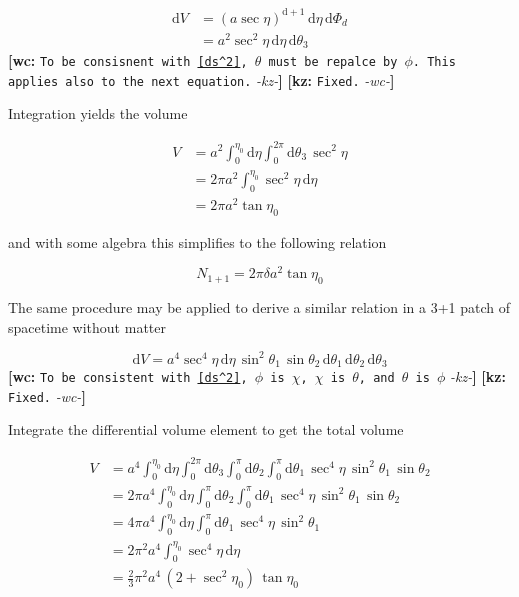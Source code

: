 \documentclass[preprint,notitlepage,amsmath,amssymb,floatfix]{revtex4-1}
\newcommand{\XXX}[3]{{\bf [#1: } {\tt #3} {\it -#2-}{\bf ]}}
\begin{document}
\begin{equation}
\begin{split}
\mathrm{d}V &= \left(a\sec\eta\right)^{\mathrm{d}+1}\,\mathrm{d}\eta\,\mathrm{d}\Phi_d \\
   &= a^2\sec^2\eta\,\mathrm{d}\eta\,\mathrm{d}\theta_3
\end{split}
\end{equation}
\XXX{wc}{kz}{To be consisnent with~\eqref{ds^2}, $\theta$ must be repalce by $\phi$. This applies also to the next equation.} \XXX{kz}{wc}{Fixed.}

\noindent Integration yields the volume

\begin{equation}
\begin{split}
V &= a^2\int_0^{\eta_0}\!\mathrm{d}\eta\int_0^{2\pi}\!\mathrm{d}\theta_3\,\sec^2\eta \\
  &= 2\pi a^2\int_0^{\eta_0}\!\sec^2\eta\,\mathrm{d}\eta \\
  &= 2\pi a^2\tan\eta_0
\end{split}
\end{equation}

\noindent and with some algebra this simplifies to the following relation

\begin{equation}
\label{eq:finalN1}
N_{\mathrm{1+1}} = 2\pi\delta a^2\tan\eta_0
\end{equation}

\noindent The same procedure may be applied to derive a similar relation in a 3+1 patch of spacetime without matter

\begin{equation}
\mathrm{d}V = a^4\sec^4\eta\,\mathrm{d}\eta\,\sin^2\theta_1\,\sin\theta_2\,\mathrm{d}\theta_1\,\mathrm{d}\theta_2\,\mathrm{d}\theta_3
\end{equation}
\XXX{wc}{kz}{To be consistent with~\eqref{ds^2}, $\phi$ is $\chi$, $\chi$ is $\theta$, and $\theta$ is $\phi$} \XXX{kz}{wc}{Fixed.}

\noindent Integrate the differential volume element to get the total volume

\begin{equation}
\begin{split}
V &= a^4\int_0^{\eta_0}\!\mathrm{d}\eta\int_0^{2\pi}\!\mathrm{d}\theta_3\int_0^\pi\!\mathrm{d}\theta_2\int_0^\pi\!\mathrm{d}\theta_1\,\sec^4\eta\,\sin^2\theta_1\,\sin\theta_2 \\
  &= 2\pi a^4\int_0^{\eta_0}\!\mathrm{d}\eta\int_0^\pi\!\mathrm{d}\theta_2\int_0^\pi\!\mathrm{d}\theta_1\,\sec^4\eta\,\sin^2\theta_1\,\sin\theta_2 \\
  &= 4\pi a^4\int_0^{\eta_0}\!\mathrm{d}\eta\int_0^\pi\!\mathrm{d}\theta_1\,\sec^4\eta\,\sin^2\theta_1 \\
  &= 2\pi^2 a^4\int_0^{\eta_0}\!\sec^4\eta\,\mathrm{d}\eta \\
  &= \frac{2}{3}\pi^2 a^4\,\left(2+\sec^2\eta_0\right)\,\tan\eta_0
\end{split}
\end{equation}
\end{document}
